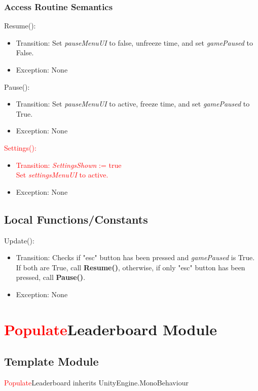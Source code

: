 \documentclass[12pt]{article}
\begin{document}
\subsubsection {Access Routine Semantics}

\noindent Resume():
\begin{itemize}
    \item Transition: Set \textit{pauseMenuUI} to false, unfreeze time, and set \textit{gamePaused} to False.
    \item Exception: None
\end{itemize}

\noindent Pause():
\begin{itemize}
    \item Transition: Set \textit{pauseMenuUI} to active, freeze time, and set \textit{gamePaused} to True.
    \item Exception: None
\end{itemize}

\noindent \textcolor{red}{Settings():}
\begin{itemize}
    \item \textcolor{red}{Transition: \textit{SettingsShown} := true \\ Set \textit{settingsMenuUI} to active.}
    \item Exception: None
\end{itemize}

\subsection{Local Functions/Constants}
Update():
\begin{itemize}
    \item Transition: Checks if "esc" button has been pressed and \textit{gamePaused} is True. If both are True, call \textbf{Resume()}, otherwise, if only "esc" button has been pressed, call \textbf{Pause()}.
    \item Exception: None
\end{itemize}

\medskip

\newpage
\section {\textcolor{red}{Populate}Leaderboard Module}

\subsection{Template Module}
\textcolor{red}{Populate}Leaderboard inherits UnityEngine.MonoBehaviour
\end{document}

